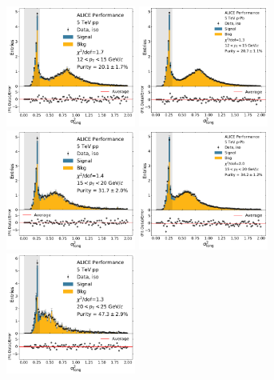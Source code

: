 \begin{figure}[h]
\center
\includegraphics[width=0.38\textwidth]{Purity/tf-example-pp-cluster_Lambda-12-15.pdf}
\includegraphics[width=0.38\textwidth]{Purity/tf-example-p-Pb-cluster_Lambda-12-15.pdf}
\\
\includegraphics[width=0.38\textwidth]{Purity/tf-example-pp-cluster_Lambda-15-20.pdf}
\includegraphics[width=0.38\textwidth]{Purity/tf-example-p-Pb-cluster_Lambda-15-20.pdf}
\includegraphics[width=0.38\textwidth]{Purity/tf-example-pp-cluster_Lambda-20-25.pdf}

\end{figure}
